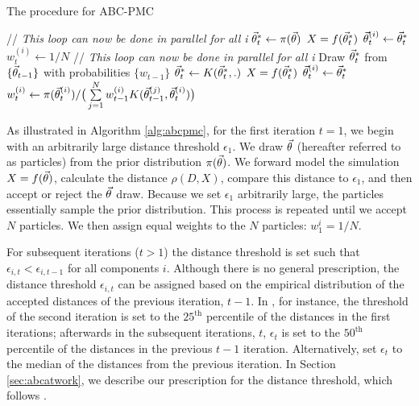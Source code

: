 \begin{algorithm} 
\caption{The procedure for ABC-PMC}
\begin{algorithmic}[1] \label{alg:abcpmc}
   \STATE // \emph{This loop can now be done in parallel for all i}
   \STATE $\vec{\theta}^{*}_{t} \gets \pi(\vec{\theta})$
   \STATE $X = f(\vec{\theta}^{*}_{t})$
   \ENDWHILE
   \STATE $\vec{\theta}^{(i)}_{t} \gets \vec{\theta}^{*}_{t}$
   \STATE $w^{(i)}_{t} \gets 1/N$
\ENDFOR
\ENDIF
{}
   \STATE // \emph{This loop can now be done in parallel for all i}
   \STATE Draw $\vec{\theta}^{*}_{t}$ from $\{\vec{\theta}_{t-1}\}$ with probabilities $\{w_{t-1}\}$
   \STATE $\vec{\theta}^{*}_{t} \gets K(\vec{\theta}^{*}_{t},.)$
   \STATE $X = f(\vec{\theta}^{*}_{t})$
   \ENDWHILE
   \STATE $\vec{\theta}^{(i)}_{t} \gets \vec{\theta}^{*}_{t}$
   \STATE $w^{(i)}_{t} \gets \pi(\vec{\theta}^{(i)}_{t}) / \big(\sum\limits_{j=1}^{N}w_{t-1}^{(i)}K(\vec{\theta}^{(j)}_{t-1},\vec{\theta}^{(i)}_{t}) \big)$
\ENDFOR
\ENDIF
\end{algorithmic}
\end{algorithm}

As illustrated in Algorithm \ref{alg:abcpmc}, for the first iteration $t = 1$, 
we begin with an arbitrarily large distance threshold $\epsilon_1$. We 
draw $\vec{\theta}$ (hereafter referred to as particles) from the prior distribution 
$\pi(\vec{\theta})$. We forward model the simulation $X = f(\vec{\theta})$, calculate the 
distance $\rho(D, X)$, compare this distance to $\epsilon_1$, and then 
accept or reject the $\vec{\theta}$ draw. Because we set $\epsilon_1$ arbitrarily large, 
the particles essentially sample the prior distribution. This process 
is repeated until we accept $N$ particles. We then assign equal weights to 
the $N$ particles: $w_1^i = 1/N$.

For subsequent iterations ($t > 1$) the distance threshold is set such that
$\epsilon_{i,t} < \epsilon_{i,t-1}$ for all components $i$. Although there is 
no general prescription, the distance threshold $\epsilon_{i,t}$ can be 
assigned based on the empirical distribution of the accepted distances of the 
previous iteration, $t-1$. In \citealt{abcsn}, for instance, the threshold of 
the second iteration is set to the $25^\mathrm{th}$ percentile of the distances 
in the first iterations; afterwards in the subsequent iterations, $t$, $\epsilon_{t}$ 
is set to the $50^\mathrm{th}$ percentile of the distances in the previous $t-1$ iteration. 
Alternatively, \citealt{abcwl} set $\epsilon_{t}$ to the median of the distances from 
the previous iteration. In Section \ref{sec:abcatwork}, we describe our prescription 
for the distance threshold, which follows \citealt{abcwl}. 

